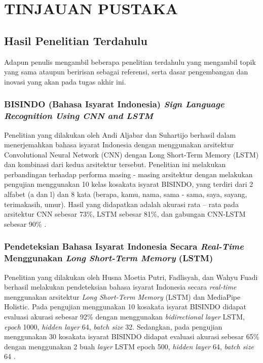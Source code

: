 \chapter{TINJAUAN PUSTAKA}
\label{chap:tinjauanpustaka}



\section{Hasil Penelitian Terdahulu}
Adapun penulis mengambil beberapa penelitian terdahulu yang mengambil topik yang sama ataupun beririsan sebagai referensi, serta dasar pengembangan dan inovasi yang akan pada tugas akhir ini.

\subsection{BISINDO (Bahasa Isyarat Indonesia) \textit{Sign Language Recognition Using CNN and LSTM}}
Penelitian yang dilakukan oleh Andi Aljabar dan Suhartijo berhasil dalam menerjemahkan bahasa isyarat Indonesia dengan menggunakan arsitektur Convolutional Neural Network (CNN) dengan Long Short-Term Memory (LSTM) dan kombinasi dari kedua arsitektur tersebut. Penelitian ini melakukan perbandingan terhadap performa masing - masing arsitektur dengan melakukan pengujian  menggunakan 10 kelas kosakata isyarat BISINDO, yang terdiri dari 2 alfabet (a dan l) dan 8 kata (berapa, kamu, nama, sama - sama, saya, sayang, terimakasih, umur). Hasil yang didapatkan adalah akurasi rata – rata pada arsitektur CNN sebesar 73\%, LSTM sebesar 81\%, dan gabungan CNN-LSTM sebesar 90\% \parencite{aljabar2020}.

\subsection{Pendeteksian Bahasa Isyarat Indonesia Secara \textit{Real-Time} Menggunakan \textit{Long Short-Term Memory} (LSTM)}
Penelitian yang dilakukan oleh Husna Moetia Putri, Fadlisyah, dan Wahyu Fuadi berhasil melakukan pendeteksian bahasa isyarat Indonesia secara \emph{real-time} menggunakan arsitektur \emph{Long Short-Term Memory} (LSTM) dan MediaPipe Holistic. Pada pengujian menggunakan 10 kosakata isyarat BISINDO didapat evaluasi akurasi sebesar 92\% dengan menggunakan \emph{bidirectional layer} LSTM, \emph{epoch} 1000, \emph{hidden layer} 64, \emph{batch size} 32. Sedangkan, pada pengujian menggunakan 30 kosakata isyarat BISINDO didapat evaluasi akurasi sebesar 65\% dengan menggunakan 2 buah \emph{layer} LSTM epoch 500, \emph{hidden layer} 64, \emph{batch size} 64 \parencite{putri2022}.
 
